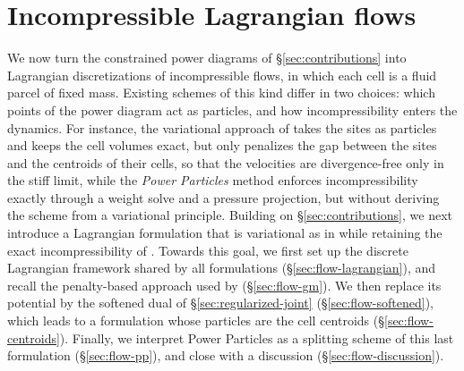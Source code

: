\documentclass[main.tex]{subfiles}
\begin{document}

\section{Incompressible Lagrangian flows}
\label{sec:flow}

We now turn the constrained power diagrams of \S\ref{sec:contributions} into Lagrangian discretizations of incompressible flows, in which each cell is a fluid parcel of fixed mass.
Existing schemes of this kind differ in two choices: which points of the power diagram act as particles, and how incompressibility enters the dynamics.
For instance, the variational approach of \citet{Gallouet2018Lagrangian} takes the sites as particles and keeps the cell volumes exact, but only penalizes the gap between the sites and the centroids of their cells, so that the velocities are divergence-free only in the stiff limit, %
while the \emph{Power Particles} method \cite{deGoes2015PowerParticles} enforces incompressibility exactly through a weight solve and a pressure projection, but without deriving the scheme from a variational principle.
% 
Building on \S\ref{sec:contributions}, we next introduce a Lagrangian formulation that is variational as in \citet{Gallouet2018Lagrangian} while retaining the exact incompressibility of \citet{deGoes2015PowerParticles}.
Towards this goal, we first set up the discrete Lagrangian framework shared by all formulations (\S\ref{sec:flow-lagrangian}), and recall the penalty-based approach used by \citet{Gallouet2018Lagrangian} (\S\ref{sec:flow-gm}).
We then replace its potential by the softened dual of \S\ref{sec:regularized-joint} (\S\ref{sec:flow-softened}), which leads to a formulation whose particles are the cell centroids (\S\ref{sec:flow-centroids}).
Finally, we interpret Power Particles as a splitting scheme of this last formulation (\S\ref{sec:flow-pp}), and close with a discussion (\S\ref{sec:flow-discussion}).
\end{document}
